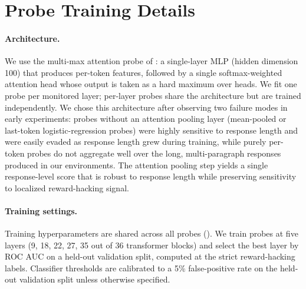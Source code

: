 \documentclass{article}
\begin{document}
\section{Probe Training Details}
\label{app:probetraining}


\paragraph{Architecture.} We use the multi-max attention probe of \citet{productionprobes}: a single-layer MLP (hidden dimension 100) that produces per-token features, followed by a single softmax-weighted attention head whose output is taken as a hard maximum over heads. We fit one probe per monitored layer; per-layer probes share the architecture but are trained independently. We chose this architecture after observing two failure modes in early experiments: probes without an attention pooling layer (mean-pooled or last-token logistic-regression probes) were highly sensitive to response length and were easily evaded as response length grew during training, while purely per-token probes do not aggregate well over the long, multi-paragraph responses produced in our environments. The attention pooling step yields a single response-level score that is robust to response length while preserving sensitivity to localized reward-hacking signal.

\paragraph{Training settings.} Training hyperparameters are shared across all probes (). We train probes at five layers (9, 18, 22, 27, 35 out of 36 transformer blocks) and select the best layer by ROC AUC on a held-out validation split, computed at the strict reward-hacking labels. Classifier thresholds are calibrated to a 5\% false-positive rate on the held-out validation split unless otherwise specified.
\end{document}
